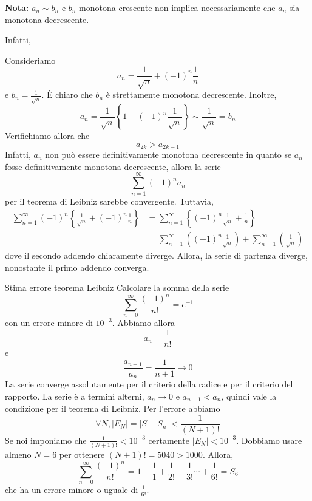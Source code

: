 \documentclass[a4paper]{article}
\begin{document}
\textbf{Nota:}
\(a_n \sim b_n\) e \(b_n\) monotona crescente non implica necessariamente che \(a_n\) sia monotona
decrescente.

Infatti,
\begin{snippetexample}{}
    Consideriamo
    \[
        a_n = \frac{1}{\sqrt{n}} + {(-1)}^n \frac{1}{n}
    \]
    e \(b_n = \frac{1}{\sqrt{n}}\).
    È chiaro che \(b_n\) è strettamente monotona decrescente.
    Inoltre, \[
        a_n = \frac{1}{\sqrt{n}} \left\{
            1 + {(-1)}^n \frac{1}{\sqrt{n}}
        \right\} \sim
        \frac{1}{\sqrt{n}} = b_n
    \]
    Verifichiamo allora che
    \[
        a_{2k} > a_{2k-1}
    \]
    Infatti, \(a_n\) non può essere definitivamente monotona decrescente in quanto
    se \(a_n\) fosse definitivamente monotona decrescente, allora la serie
    \[
        \sum_{n=1}^\infty {(-1)}^n a_n
    \]
    per il teorema di Leibniz sarebbe convergente.
    Tuttavia,
    \begin{align*}
        \sum_{n=1}^\infty {(-1)}^n \left\{
            \frac{1}{\sqrt{n}} + {(-1)}^n \frac{1}{n}
        \right\}
        &=  \sum_{n=1}^\infty \left\{
            {(-1)}^n \frac{1}{\sqrt{n}} + \frac{1}{n}
        \right\} \\
        &= \sum_{n=1}^\infty \left( {(-1)}^n \frac{1}{\sqrt{n}} \right)
        + \sum_{n=1}^\infty \left( \frac{1}{\sqrt{n}} \right)
    \end{align*}
    dove il secondo addendo chiaramente diverge.
    Allora, la serie di partenza diverge, nonostante il primo addendo converga.
\end{snippetexample}

\pagebreak

\begin{snippetexample}{Stima errore teorema Leibniz}
    Calcolare la somma della serie
    \[
        \sum_{n=0}^\infty \frac{{(-1)}^n}{n!} = e^{-1}
    \]
    con un errore minore di \(10^{-3}\).
    Abbiamo allora
    \[
        a_n = \frac{1}{n!}
    \]
    e \[
        \frac{a_{n+1}}{a_n} = \frac{1}{n+1} \to 0
    \]
    La serie converge assolutamente per il criterio della radice e per il criterio del rapporto.
    La serie è a termini alterni, \(a_n \to 0\) e \(a_{n+1} < a_n\), quindi vale la condizione per il teorema di Leibniz.
    Per l'errore abbiamo
    \[
        \forall N, |E_N| = |S - S_n| < \frac{1}{(N+1)!}
    \]
    Se noi imponiamo che \(\frac{1}{(N+1)!} < 10^{-3}\) certamente \(|E_N| < 10^{-3}\).
    Dobbiamo usare almeno \(N=6\) per ottenere \((N+1)!=5040 > 1000\).
    Allora,
    \[
        \sum_{n=0}^\infty \frac{{(-1)}^n}{n!} = 1 - \frac{1}{1} + \frac{1}{2!} - \frac{1}{3!}
        \cdots + \frac{1}{6!} = S_6
    \]
    che ha un errore minore o uguale di \(\frac{1}{6!}\).
\end{snippetexample}
\end{document}
